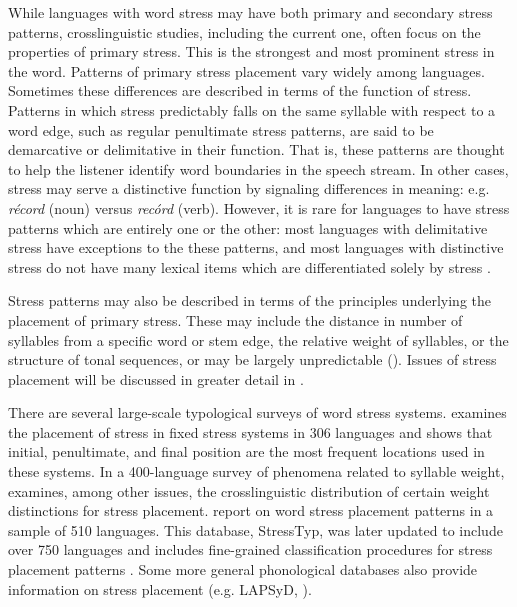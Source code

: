   \hspace*{-0.48206pt}While languages with word stress may have both primary and secondary stress patterns, crosslinguistic studies, including the current one, often focus on the properties of primary stress. This is the strongest and most prominent stress in the word. Patterns of primary stress placement vary widely among languages. Sometimes these differences are described in terms of the function of stress. Patterns in which stress predictably falls on the same syllable with respect to a word edge, such as regular penultimate stress patterns, are said to be demarcative or delimitative in their function. That is, these patterns are thought to help the listener identify word boundaries in the speech stream. In other cases, stress may serve a distinctive function by signaling differences in meaning: e.g.  \textit{récord} (noun) versus \textit{recórd} (verb). However, it is rare for languages to have stress patterns which are entirely one or the other: most languages with delimitative stress have exceptions to the these patterns, and most languages with distinctive stress do not have many lexical items which are differentiated solely by stress \citep[14--15]{Cruttenden1997}. 

  Stress patterns may also be described in terms of the principles underlying the placement of primary stress. These may include the distance in number of syllables from a specific word or stem edge, the relative weight of syllables, or the structure of tonal sequences, or may be largely unpredictable (\citealt{vanderHulst2010}). Issues of stress placement will be discussed in greater detail in .

  There are several large-scale typological surveys of word stress systems. \citet{Hyman1977} examines the placement of stress in fixed stress systems in 306 languages and shows that initial, penultimate, and final position are the most frequent locations used in these systems. In a 400-language survey of phenomena related to syllable weight, \citet{Gordon2006} examines, among other issues, the crosslinguistic distribution of certain weight distinctions for stress placement. \citet{GoedemansvanderHulst2013a,GoedemansvanderHulst2013b} report on word stress placement patterns in a sample of 510 languages. This database, StressTyp, was later updated to include over 750 languages and includes fine-grained classification procedures for stress placement patterns \citep{GoedemansEtAl2017}. Some more general phonological databases also provide information on stress placement (e.g. LAPSyD, \citealt{MaddiesonEtAl2013}).

